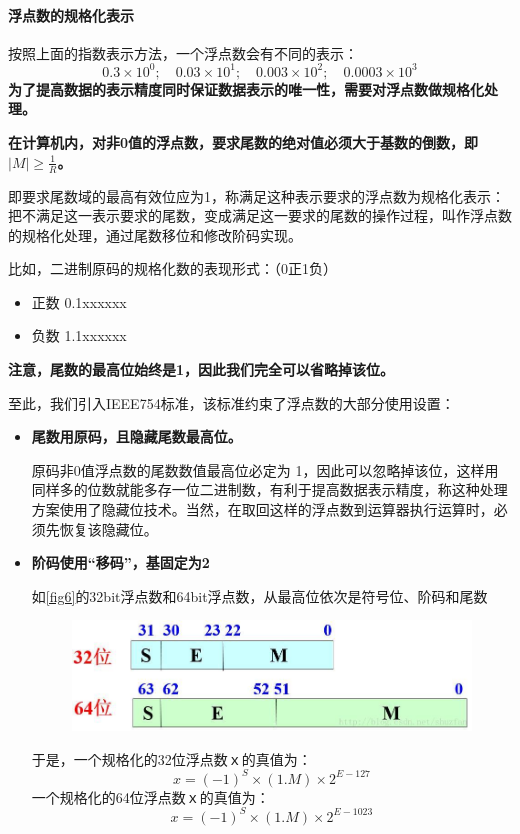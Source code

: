 \paragraph*{浮点数的规格化表示}
按照上面的指数表示方法，一个浮点数会有不同的表示：
$$0.3\times 10^0;\quad 0.03\times 10^1;\quad 0.003\times10^2;\quad 0.0003\times 10^3$$
\textbf{为了提高数据的表示精度同时保证数据表示的唯一性，需要对浮点数做规格化处理。}

\textbf{在计算机内，对非0值的浮点数，要求尾数的绝对值必须大于基数的倒数，即$|M|\ge\frac{1}{R}$。}

即要求尾数域的最高有效位应为1，称满足这种表示要求的浮点数为规格化表示：把不满足这一表示要求的尾数，变成满足这一要求的尾数的操作过程，叫作浮点数的规格化处理，通过尾数移位和修改阶码实现。

比如，二进制原码的规格化数的表现形式：（0正1负）
\begin{itemize}
\item 正数 0.1xxxxxx
\item 负数 1.1xxxxxx
\end{itemize}

\textbf{注意，尾数的最高位始终是1，因此我们完全可以省略掉该位。}

至此，我们引入IEEE754标准，该标准约束了浮点数的大部分使用设置：
\begin{itemize}
\item \textbf{尾数用原码，且隐藏尾数最高位。}

原码非0值浮点数的尾数数值最高位必定为 1，因此可以忽略掉该位，这样用同样多的位数就能多存一位二进制数，有利于提高数据表示精度，称这种处理方案使用了隐藏位技术。当然，在取回这样的浮点数到运算器执行运算时，必须先恢复该隐藏位。
\item \textbf{阶码使用“移码”，基固定为2}

如\autoref{fig6}的32bit浮点数和64bit浮点数，从最高位依次是符号位、阶码和尾数 
\begin{figure}[!ht]
\centering
\includegraphics[width=\textwidth]{images/1.jpg}
\caption{}\label{fig6}
\end{figure}
于是，一个规格化的32位浮点数ｘ的真值为：
$$x=(-1)^S\times(1.M)\times 2^{E-127}$$
一个规格化的64位浮点数ｘ的真值为：
$$x=(-1)^S\times(1.M)\times 2^{E-1023}$$
\end{itemize}

